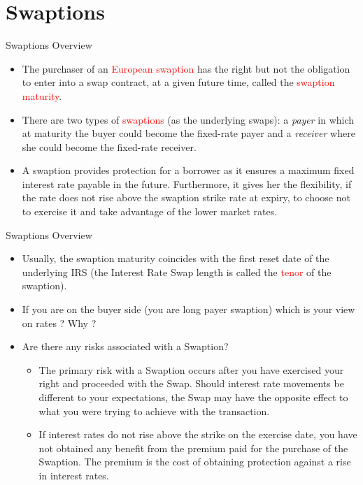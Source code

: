 \documentclass{beamer}
\begin{document}
\section{Swaptions}
\begin{frame}{Swaptions Overview}
\begin{itemize}
	\item<1-> The purchaser of an \textcolor{red}{European swaption} has the right but not the obligation to enter into a swap contract, at a given future time, called the \textcolor{red}{swaption maturity}.
	\item<2-> There are two types of \textcolor{red}{swaptions} (as the underlying swaps): a \emph{payer} in which at maturity the buyer could become the fixed-rate payer and a \emph{receiver} where she could become the fixed-rate receiver.
	\item<3-> A swaption provides protection for a borrower as it ensures a maximum fixed interest rate payable in the future. Furthermore, it gives her the flexibility, if the rate does not rise above the swaption strike rate at expiry, to choose not to exercise it and take advantage of the lower market rates.
\end{itemize}
\end{frame}

\begin{frame}{Swaptions Overview}
	\begin{itemize}
	\item<1-> Usually, the swaption maturity coincides with the first reset date of the underlying IRS (the Interest Rate Swap length is called the \textcolor{red}{tenor} of the swaption).	
	\item<2-> If you are on the buyer side (you are long payer swaption) which is your view on rates ? Why ?
	\item<3-> Are there any risks associated with a Swaption?
	\begin{itemize}
		\item<4-> The primary risk with a Swaption occurs after you have exercised your right and proceeded with the Swap. Should interest rate movements be different to your expectations, the Swap may have the opposite effect to what you were trying to achieve with the transaction. 
		\item<5-> If interest rates do not rise above the strike on the exercise date, you have not obtained any benefit from the premium paid for the purchase of the Swaption. The premium is the cost of obtaining protection against a rise in interest rates.
	\end{itemize}
\end{itemize}
\end{frame}
\end{document}
